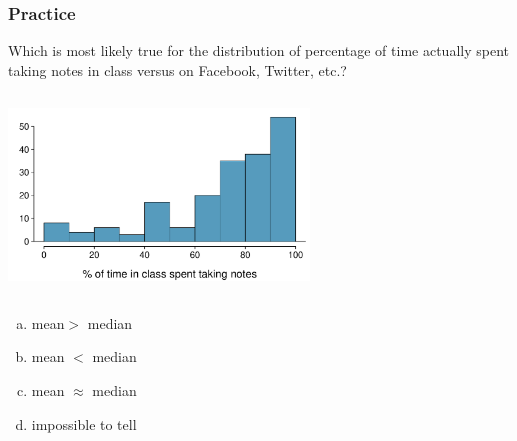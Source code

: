 \documentclass[notes,11pt, aspectratio=169]{beamer}
\newcommand{\pq}[1]{
\begin{beamerboxesrounded}[shadow = false, lower = prac ques body]{}
#1
\end{beamerboxesrounded}
}
\begin{document}
\begin{frame}
\frametitle{Practice}

\pq{{\small Which is most likely true for the distribution of percentage of time actually spent taking notes in class versus on Facebook, Twitter, etc.?}}

\vspace{-0.5cm}

\begin{columns}
\begin{center}
\includegraphics[width=0.6\textwidth]{graphs/l02f12.pdf}
\end{center}
\end{columns}

{\small
\begin{enumerate}[(a)]
\item mean$>$ median
\item mean $<$ median
\item mean $\approx$ median
\item impossible to tell
\end{enumerate}
}

\end{frame}


\end{document}
